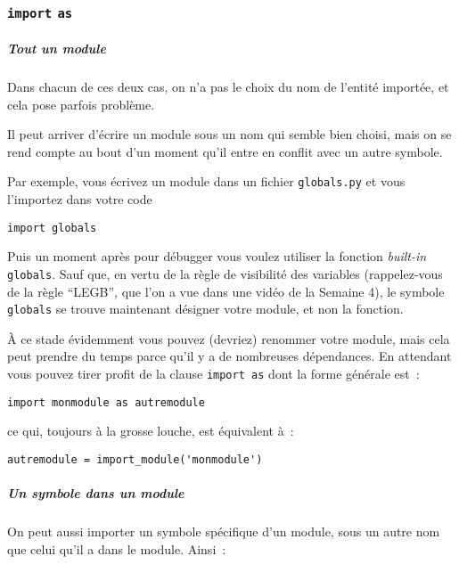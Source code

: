     \hypertarget{import-as}{%
\subsubsection{\texorpdfstring{\texttt{import}
\texttt{as}}{import as}}\label{import-as}}

    \hypertarget{tout-un-module}{%
\subparagraph{Tout un module}\label{tout-un-module}}

    Dans chacun de ces deux cas, on n'a pas le choix du nom de l'entité
importée, et cela pose parfois problème.

Il peut arriver d'écrire un module sous un nom qui semble bien choisi,
mais on se rend compte au bout d'un moment qu'il entre en conflit avec
un autre symbole.

Par exemple, vous écrivez un module dans un fichier \texttt{globals.py}
et vous l'importez dans votre code

    \begin{verbatim}
import globals
\end{verbatim}

    Puis un moment après pour débugger vous voulez utiliser la fonction
\emph{built-in} \texttt{globals}. Sauf que, en vertu de la règle de
visibilité des variables (rappelez-vous de la règle ``LEGB'', que l'on a
vue dans une vidéo de la Semaine 4), le symbole \texttt{globals} se
trouve maintenant désigner votre module, et non la fonction.

    À ce stade évidemment vous pouvez (devriez) renommer votre module, mais
cela peut prendre du temps parce qu'il y a de nombreuses dépendances. En
attendant vous pouvez tirer profit de la clause \texttt{import\ as} dont
la forme générale est~:

    \begin{verbatim}
import monmodule as autremodule
\end{verbatim}

    ce qui, toujours à la grosse louche, est équivalent à~:

    \begin{verbatim}
autremodule = import_module('monmodule')
\end{verbatim}

    \hypertarget{un-symbole-dans-un-module}{%
\subparagraph{Un symbole dans un
module}\label{un-symbole-dans-un-module}}

    On peut aussi importer un symbole spécifique d'un module, sous un autre
nom que celui qu'il a dans le module. Ainsi~:


